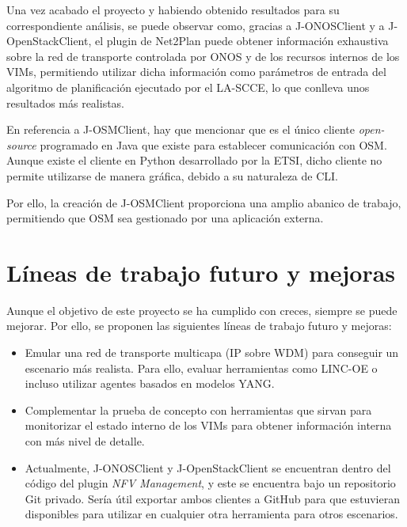 Una vez acabado el proyecto y habiendo obtenido resultados para su correspondiente análisis, se puede observar como, gracias a J-ONOSClient y a J-OpenStackClient, el plugin de Net2Plan puede obtener información exhaustiva sobre la red de transporte controlada por \ac{ONOS} y de los recursos internos de los \acp{VIM}, permitiendo utilizar dicha información como parámetros de entrada del algoritmo de planificación ejecutado por el \ac{LA-SCCE}, lo que conlleva unos resultados más realistas.

En referencia a J-OSMClient, hay que mencionar que es el único cliente \textit{open-source} programado en Java que existe para establecer comunicación con \ac{OSM}. Aunque existe el cliente en Python desarrollado por la \ac{ETSI}, dicho cliente no permite utilizarse de manera gráfica, debido a su naturaleza de \ac{CLI}. 

Por ello, la creación de J-OSMClient proporciona una amplio abanico de trabajo, permitiendo que \ac{OSM} sea gestionado por una aplicación externa.


\section{Líneas de trabajo futuro y mejoras}

Aunque el objetivo de este proyecto se ha cumplido con creces, siempre se puede mejorar. Por ello, se proponen las siguientes líneas de trabajo futuro y mejoras:

\begin{itemize}
	
	\item Emular una red de transporte multicapa (\ac{IP} sobre \ac{WDM}) para conseguir un escenario más realista. Para ello, evaluar herramientas como LINC-OE\cite{lincoebib} o incluso utilizar agentes basados en modelos \ac{YANG}.
	
	\item Complementar la prueba de concepto con herramientas que sirvan para monitorizar el estado interno de los \acp{VIM} para obtener información interna con más nivel de detalle.
	
	\item Actualmente, J-ONOSClient y J-OpenStackClient se encuentran dentro del código del plugin \textit{NFV Management}, y este se encuentra bajo un repositorio Git privado. Sería útil exportar ambos clientes a GitHub para que estuvieran disponibles para utilizar en cualquier otra herramienta para otros escenarios.
	
\end{itemize}

\cleardoublepage